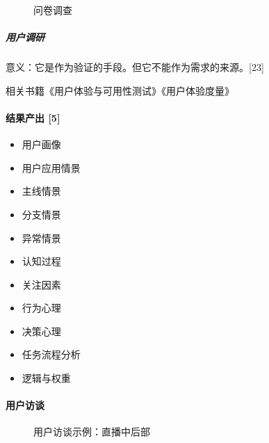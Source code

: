 \documentclass[letterpaper,11pt,english]{sphinxmanual}
\begin{document}
\begin{figure}[H]
\centering
\capstart

\noindent{}
\caption{问卷调查}\label{\detokenize{chapter_knowledge/users_analysis:id43}}\end{figure}


\subparagraph{用户调研}
\label{\detokenize{chapter_knowledge/users_analysis:id30}}
意义：它是作为验证的手段。但它不能作为需求的来源。{[}23{]}

相关书籍《用户体验与可用性测试》《用户体验度量》


\paragraph{结果产出 {[}5{]}}
\label{\detokenize{chapter_knowledge/users_analysis:id31}}\begin{itemize}
\item {} 
用户画像

\item {} 
用户应用情景

\item {} 
主线情景

\item {} 
分支情景

\item {} 
异常情景

\item {} 
认知过程

\item {} 
关注因素

\item {} 
行为心理

\item {} 
决策心理

\item {} 
任务流程分析

\item {} 
逻辑与权重

\end{itemize}


\paragraph{用户访谈}
\label{\detokenize{chapter_knowledge/users_analysis:id32}}
\begin{figure}[H]
\centering
\capstart

\noindent{}
\caption{用户访谈示例：直播中后部}\label{\detokenize{chapter_knowledge/users_analysis:id44}}\end{figure}
\end{document}
